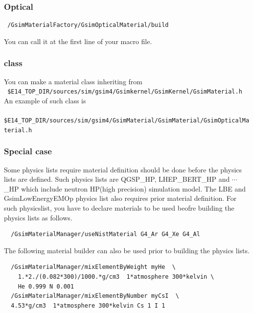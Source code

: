 \documentclass[a4paper,12pt]{article}
\begin{document}
 \subsubsection{Optical}
 \begin{screen}
  \begin{verbatim}
 /GsimMaterialFactory/GsimOpticalMaterial/build\end{verbatim}
 \end{screen}
 You can call it at the first line of your macro file.
 \subsubsection{class}
 You can make a material class inheriting from\\
 {\tt
 \$E14\_TOP\_DIR/sources/sim/gsim4/Gsimkernel/GsimKernel/GsimMaterial.h}\\
 An example of such class is \\
 {\tt
 \$E14\_TOP\_DIR/sources/sim/gsim4/GsimMaterial/GsimMaterial/GsimOpticalMaterial.h}
 \subsubsection{Special case}
 Some physics lists require material definition should be done before the
 physics lists are defined. Such physics lists are
 QGSP\_HP, LHEP\_BERT\_HP and $\cdots$\_HP which include 
 neutron HP(high precision)  simulation model.
 The LBE and GsimLowEnergyEMOp physics list also requires prior material
 definition. For such physicslist, 
 you have to declare materials to be used beofre building the physics
 lists as follows. 
 \begin{screen}
  \begin{verbatim}
  /GsimMaterialManager/useNistMaterial G4_Ar G4_Xe G4_Al\end{verbatim}
 \end{screen}
 The following material builder can also be used prior to
 building the physics lists. 
 \begin{screen}
  \begin{verbatim}
  /GsimMaterialManager/mixElementByWeight myHe  \ 
    1.*2./(0.082*300)/1000.*g/cm3  1*atmosphere 300*kelvin \
    He 0.999 N 0.001
  /GsimMaterialManager/mixElementByNumber myCsI  \ 
  4.53*g/cm3  1*atmosphere 300*kelvin Cs 1 I 1\end{verbatim}
 \end{screen}
\end{document}
